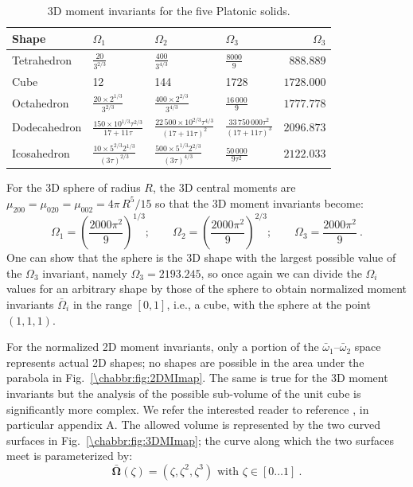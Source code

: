 \begin{table}[h!]
\centering\leavevmode
\begin{tabular}{llllr}
\hline
\textbf{Shape}  &  $\Omega_1$  &  $\Omega_2$ &  $\Omega_3$ & $\Omega_3$\\
\hline
Tetrahedron & $\frac{20}{3^{2/3}}$& $\frac{400}{3^{4/3}}$& $\frac{8000}{9}$&$888.889$ \\
Cube &12 & 144&1728& $1728.000$ \\
Octahedron & $\frac{20\times 2^{1/3}}{3^{2/3}}$&$\frac{400\times 2^{2/3}}{3^{4/3}}$ & $\frac{16\,000}{9}$& $1777.778$\\
Dodecahedron & $\frac{150\times10^{1/3}\tau^{2/3}}{17+11\tau}$& $\frac{22\,500\times10^{2/3}\tau^{4/3}}{(17+11\tau)^2}$& $\frac{33\,750\,000\tau^{2}}{(17+11\tau)^3}$&$2096.873$ \\
Icosahedron &$\frac{10\times 5^{2/3}2^{1/3}}{(3\tau)^{2/3}}$ & $\frac{500\times 5^{1/3}2^{2/3}}{(3\tau)^{4/3}}$& $\frac{50\,000}{9\tau^2}$& $2122.033$ \\
\hline
\end{tabular}
\caption{\label{\chabbr:tb:Platonic}3D moment invariants for the five Platonic solids.}
\end{table}

For the 3D sphere of radius $R$, the 3D central moments are $\mu_{200}=\mu_{020}=\mu_{002}=4\pi\,R^5/15$ so that the 3D moment invariants become:
\begin{equation}
	\Omega_1 = \left(\frac{2000\pi^2}{9}\right)^{1/3};\qquad \Omega_2 = \left(\frac{2000\pi^2}{9}\right)^{2/3};\qquad \Omega_3 = \frac{2000\pi^2}{9}\ .
\end{equation}
One can show that the sphere is the 3D shape with the largest possible value of the $\Omega_3$ invariant, namely $\Omega_3=2193.245$, so once again we can divide the $\Omega_i$ values for an arbitrary shape by those of the sphere to obtain normalized moment invariants $\bar{\Omega}_i$ in the range $[0,1]$, i.e., a cube, with the sphere at the point $(1,1,1)$.

For the normalized 2D moment invariants, only a portion of the $\bar{\omega}_1$--$\bar{\omega}_2$ space represents actual 2D shapes; no shapes are possible in the area under the parabola in Fig.~\ref{\chabbr:fig:2DMImap}. The same is true for the 3D moment invariants but the analysis of the possible sub-volume of the unit cube is significantly more complex.  We refer the interested reader to reference \cite{degraef2008b}, in particular appendix A. The allowed volume is represented by the two curved surfaces in Fig.~\ref{\chabbr:fig:3DMImap}; the curve along which the two surfaces meet is parameterized by:
\begin{equation}
	\bar{\bm{\Omega}}(\zeta) = (\zeta,\zeta^2,\zeta^3)\text{ with }\zeta\in[0\ldots 1]\ .
\end{equation}



